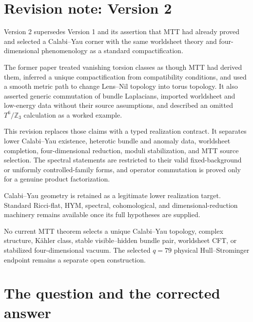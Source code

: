 \documentclass[11pt]{article}
\theoremstyle{definition}
\theoremstyle{remark}
\begin{document}
\section*{Revision note: Version 2}
\begin{description}[leftmargin=2.5cm,style=nextline]
\item[Supersedes]
Version 2 supersedes Version 1 and its assertion that MTT had already proved
and selected a Calabi--Yau corner with the same worldsheet theory and
four-dimensional phenomenology as a standard compactification.

\item[Reason]
The former paper treated vanishing torsion classes as though MTT had derived
them, inferred a unique compactification from compatibility conditions, and
used a smooth metric path to change Lens--Nil topology into torus topology.
It also asserted generic commutation of bundle Laplacians, imported
worldsheet and low-energy data without their source assumptions, and described
an omitted \(T^6/\mathbb Z_3\) calculation as a worked example.

\item[Resolution]
This revision replaces those claims with a typed realization contract.  It
separates lower Calabi--Yau existence, heterotic bundle and anomaly data,
worldsheet completion, four-dimensional reduction, moduli stabilization, and
MTT source selection.  The spectral statements are restricted to their valid
fixed-background or uniformly controlled-family forms, and operator
commutation is proved only for a genuine product factorization.

\item[Retained content]
Calabi--Yau geometry is retained as a legitimate lower realization target.
Standard Ricci-flat, HYM, spectral, cohomological, and dimensional-reduction
machinery remains available once its full hypotheses are supplied.

\item[Remaining boundary]
No current MTT theorem selects a unique Calabi--Yau topology, complex
structure, K\"ahler class, stable visible--hidden bundle pair, worldsheet CFT,
or stabilized four-dimensional vacuum.  The selected \(q=79\) physical
Hull--Strominger endpoint remains a separate open construction.
\end{description}

\tableofcontents

\section{The question and the corrected answer}
\label{sec:intro}
\end{document}
